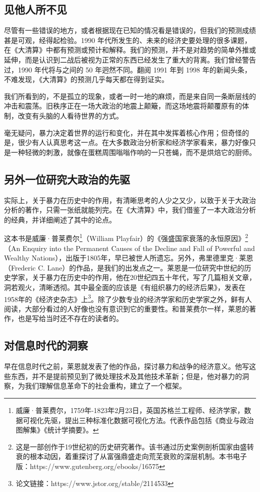 \subsection{见他人所不见}
尽管有一些错误的地方，或者根据现在已知的情况看是错误的，但我们的预测成绩甚是可观，经得起检验。1990 年代所发生的、未来的经济史要处理的很多课题，在《大清算》中都有预测或预计和解释。我们的预测，并不是对趋势的简单外推或延伸，而是认识到二战后被视为正常的东西已经发生了重大的背离。我们曾经警告过，1990 年代将与之间的 50 年迥然不同。翻阅 1991 年到 1998 年的新闻头条，不难发现，《大清算》的预测几乎每天都在得到证实。

我们所看到的，不是孤立的现象，或者一时一地的麻烦，而是来自同一条断层线的冲击和震荡。旧秩序正在一场大政治的地震上颠簸，而这场地震将颠覆原有的体制，改变有头脑的人看待世界的方式。

毫无疑问，暴力决定着世界的运行和变化，并在其中发挥着核心作用；但奇怪的是，很少有人认真思考这一点。在大多数政治分析家和经济学家看来，暴力好像只是一种轻微的刺激，就像在蛋糕周围嗡嗡作响的一只苍蝇，而不是烘焙它的厨师。


\subsection{另外一位研究大政治的先驱}
实际上，关于暴力在历史中的作用，有清晰思考的人少之又少，以致于关于大政治分析的著作，只需一张纸就能列完。在《大清算》中，我们借鉴了一本大政治分析的经典，并详细阐述了其中的论点。

这本书是威廉·普莱费尔\footnote{威廉·普莱费尔，1759年-1823年2月23日，英国苏格兰工程师、经济学家，数据可视化先驱，提出三种标准化数据可视化方法。代表作品包括《商业与政治图解集》《统计学摘要》。}（William Playfair）的《强盛国家衰落的永恒原因》\footnote{这是一部创作于19世纪初的历史研究著作。该书通过历史案例剖析国家由盛转衰的根本动因，着重探讨了从富强鼎盛走向荒芜衰败的深层机制。本书电子版：https://www.gutenberg.org/ebooks/16575}（An Enquiry into the Permanent Causes of the Decline and Fall of Powerful and Wealthy Nations），出版于1805年，早已被世人所遗忘。另外，弗里德里克·莱恩（Frederic C. Lane）的作品，是我们的出发点之一。莱恩是一位研究中世纪的历史学家，关于暴力在历史中的作用，他在20世纪四五十年代，写了几篇相关文章，洞若观火，清晰透彻。其中最全面的应该是《有组织暴力的经济后果》，发表在1958年的《经济史杂志》上\footnote{论文链接：https://www.jstor.org/stable/2114533}。除了少数专业的经济学家和历史学家之外，鲜有人阅读，大部分看过的人好像也没有意识到它的重要性。和普莱费尔一样，莱恩的著作，也是写给当时还不存在的读者的。


\subsection{对信息时代的洞察}
早在信息时代之前，莱恩就发表了他的作品，探讨暴力和战争的经济意义。他写这些东西，并不是提前预见到了微处理技术及其他技术革新；但是，他对暴力的洞察，为我们理解信息革命下的社会重构，建立了一个框架。


